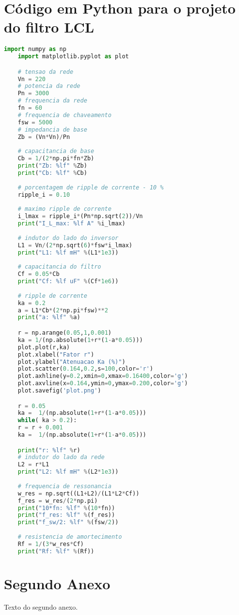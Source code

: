 \begin{anexosenv}

\partanexos

\chapter{Código em Python para o projeto do filtro LCL}\label{codigo-python-filtro}

\begin{lstlisting}[language=Python]
    import numpy as np 
    import matplotlib.pyplot as plot

    # tensao da rede
    Vn = 220
    # potencia da rede
    Pn = 3000
    # frequencia da rede
    fn = 60
    # frequencia de chaveamento
    fsw = 5000
    # impedancia de base
    Zb = (Vn*Vn)/Pn
    
    # capacitancia de base
    Cb = 1/(2*np.pi*fn*Zb)
    print("Zb: %lf" %Zb)
    print("Cb: %lf" %Cb)
    
    # porcentagem de ripple de corrente - 10 %
    ripple_i = 0.10
    
    # maximo ripple de corrente
    i_lmax = ripple_i*(Pn*np.sqrt(2))/Vn
    print("I_L_max: %lf A" %i_lmax)
    
    # indutor do lado do inversor
    L1 = Vn/(2*np.sqrt(6)*fsw*i_lmax)
    print("L1: %lf mH" %(L1*1e3))
    
    # capacitancia do filtro
    Cf = 0.05*Cb
    print("Cf: %lf uF" %(Cf*1e6))
    
    # ripple de corrente
    ka = 0.2
    a = L1*Cb*(2*np.pi*fsw)**2
    print("a: %lf" %a)

    r = np.arange(0.05,1,0.001)
    ka = 1/(np.absolute(1+r*(1-a*0.05)))
    plot.plot(r,ka)
    plot.xlabel("Fator r")
    plot.ylabel("Atenuacao Ka (%)")
    plot.scatter(0.164,0.2,s=100,color='r')
    plot.axhline(y=0.2,xmin=0,xmax=0.16400,color='g')
    plot.axvline(x=0.164,ymin=0,ymax=0.200,color='g')
    plot.savefig('plot.png')

    r = 0.05
    ka =  1/(np.absolute(1+r*(1-a*0.05)))
    while( ka > 0.2):
    r = r + 0.001
    ka =  1/(np.absolute(1+r*(1-a*0.05)))

    print("r: %lf" %r)
    # indutor do lado da rede
    L2 = r*L1
    print("L2: %lf mH" %(L2*1e3))
    
    # frequencia de ressonancia
    w_res = np.sqrt((L1+L2)/(L1*L2*Cf))
    f_res = w_res/(2*np.pi)
    print("10*fn: %lf" %(10*fn))
    print("f_res: %lf" %(f_res))
    print("f_sw/2: %lf" %(fsw/2))
    
    # resistencia de amortecimento
    Rf = 1/(3*w_res*Cf)
    print("Rf: %lf" %(Rf))

\end{lstlisting}

\chapter{Segundo Anexo}

Texto do segundo anexo.

\end{anexosenv}

